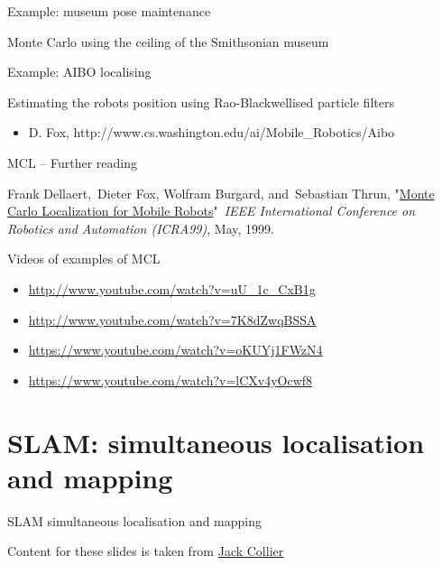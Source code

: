 \documentclass[compress]{beamer}
\begin{document}
\begin{frame}{Example: museum pose maintenance}

Monte Carlo using the ceiling of the Smithsonian museum

    \begin{center}
    \end{center}

\end{frame}

\begin{frame}{Example: AIBO localising}

Estimating the robots position using Rao-Blackwellised particle filters

\begin{itemize}
\item D. Fox, http://www.cs.washington.edu/ai/Mobile\_Robotics/Aibo
\end{itemize}

\end{frame}

\begin{frame}{MCL -- Further reading}

Frank Dellaert,~Dieter Fox, Wolfram Burgard, and~Sebastian Thrun,
"\href{http://www.ri.cmu.edu/publication_view.html?pub_id=533}{Monte
Carlo Localization for Mobile Robots}"~\emph{IEEE International
Conference on Robotics and Automation (ICRA99)}, May, 1999.

Videos of examples of MCL

\begin{itemize}
\item \url{http://www.youtube.com/watch?v=uU_1c_CxB1g}
\item \url{http://www.youtube.com/watch?v=7K8dZwqBSSA}
\item \url{https://www.youtube.com/watch?v=oKUYj1FWzN4}
\item \url{https://www.youtube.com/watch?v=lCXv4yOcwf8}
\end{itemize}

\end{frame}

\section{SLAM: simultaneous localisation and mapping}

\begin{frame}{SLAM simultaneous localisation and mapping}

Content for these slides is taken from
\href{http://www.computerrobotvision.org/2010/slam_camp.html}{Jack
Collier}

\end{frame}
\end{document}
